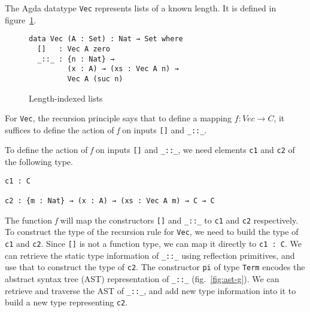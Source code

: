 \documentclass[sigplan,10pt]{acmart}
\begin{document}
The Agda datatype \texttt{Vec} represents lists of a known length. It is defined in figure~\ref{fig:vec}. 

\begin{figure}
\begin{center}
\begingroup
\begin{BVerbatim}
data Vec (A : Set) : Nat → Set where
  []   : Vec A zero
  _::_ : {n : Nat} →
         (x : A) → (xs : Vec A n) → 
         Vec A (suc n)
\end{BVerbatim}
\endgroup
\end{center}
\caption{Length-indexed lists}
\label{fig:vec}
\end{figure}

For {\tt Vec}, the recursion principle says that to define a mapping $f : Vec \rightarrow C$, it suffices to define the action of \emph{f} on inputs {\tt []} and {\tt \_::\_}.



To define the action of \emph{f} on inputs {\tt []} and {\tt \_::\_}, we need elements {\tt c1} and {\tt c2} of the following type.

\begin{center}
\begingroup
\fontsize{9pt}{2pt}\selectfont
\begin{Verbatim}
c1 : C

c2 : {m : Nat} → (x : A) → (xs : Vec A m) → C → C
\end{Verbatim}
\endgroup
\end{center}
\normalsize


The function \emph{f} will map the constructors {\tt []} and {\tt \_::\_} to {\tt c1} and {\tt c2} respectively. To construct the type of the recursion rule for {\tt Vec}, we need to build the type of {\tt c1} and {\tt c2}. Since {\tt []} is not a function type, we can map it directly to {\tt c1 : C}. We can retrieve the static type information of {\tt \_::\_} using reflection primitives, and use that to construct the type of {\tt c2}. The constructor {\tt pi} of type {\tt Term} encodes the abstract syntax tree (AST) representation of {\tt \_::\_} (fig.~\ref{fig:ast-g}). We can retrieve and traverse the AST of {\tt \_::\_}, and add new type information into it to build a new type representing {\tt c2}.
\end{document}
